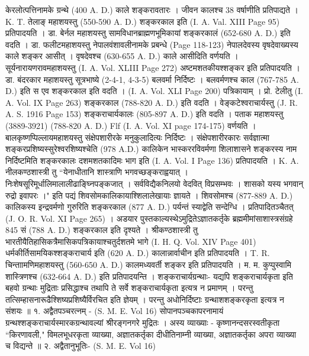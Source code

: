 केरलोत्पत्तिनामके ग्रन्थे (400 A. D.) काले शङ्करावतारः । जीवन कालश्च 38 वर्षाणीति प्रतिपाद्यते । K. T. तेलाङ् महाशयस्तु (550-590 A. D.) शङ्करकाल इति  (I. A. Val. XIII Page 95) प्रतिपादयति । डा. बेर्नल महाशयस्तु सामविधानब्राह्मणभूमिकायां शङ्करकालं (652-680 A. D.) इति वदति । डा. फलीटमहाशयस्तु नेपालवंशावलीनामके प्रबन्धे  (Page 118-123) नेपालदेवस्य वृषदेवाख्यस्य काले शङ्कर आसीत् । वृषदेवश्च (630-655 A. D.) काले आसीदिति वर्णयति । सूर्यनारायणरावमहाशयस्तु (I. A. Vol. XLIII Page 272) अष्टमशतकीयश्शङ्कर इति प्रतिपादयति । डा. बंदरकार महाशयस्तु सूत्रभाष्ये (2-4-1, 4-3-5) बलवर्मा निर्दिष्टः । बलवर्मणश्च काल (767-785 A. D.) इति स एव शङ्करकाल इति वदति । (I. A. Vol. XLI Page 200) पत्रिकायाम् । प्रो. टेलीतु (I. A. Vol. IX Page 263) शङ्करकाल (788-820 A. D.) इति वदति । वेङ्कटेश्वराचार्यस्तु (J. R. A. S. 1916 Page 153) शङ्कराचार्यकालः (805-897 A. D.) इति वदति । पताक महाशयस्तु (3889-3921) (788-820 A. D.) Flf (I. A. Vol. XI page 174-175) वर्णयति । बालकृष्णप्पिल्लायमहाशयस्तु संक्षेपशारीरके मनुकुलादित्यः निर्दिष्टः । संक्षेपशारीरकारः सर्वज्ञात्मा शङ्करप्रशिष्यस्सुरेश्वरशिष्यश्चेति (978 A.D.) कालिकेन भास्कररविवर्मणा शिलाशासने शङ्करस्य नाम निर्दिष्टमिति शङ्करकालः दशमशतकादिमः भाग इति (I. A. Vol. I Page 136) प्रतिपादयति । K. A. नीलकण्ठशास्त्री तु ``येनाधीतानि शास्त्राणि भगवच्छङ्कराह्वयात् । निःशेषसूरिमूर्धालिमालालीढाङ्घ्निपङ्कजात् । सर्वविद्यैकनिलयो वेदवित् विप्रसम्भवः । शासको यस्य भगवान् रुद्रो इवापरः ।" इति पद्यं शिवसोमकालिकायाश्शिलालेखायाः ज्ञायते । शिवसोमश्च (877-889 A. D.) कालिकस्य इन्द्रवर्मणो गुरुरिति शङ्करकाल (877 A. D.) पर्यन्तं स्याद्वेति सन्देग्धि । प्रतिपादितञ्चैतत् (J. O. R. Vol. XI Page 265) । अडयार पुस्तकाल्यस्थेऽमुद्रितेऽज्ञातकर्तृके ब्रह्ममीमांसाशास्त्रसंग्रहे 845 सं (788 A. D.) शङ्करकाल इति दृश्यते । श्रीकण्ठशास्त्री तु भारतीयैतिहासिकत्रैमासिकपत्रिकायाश्चतुर्दशतमे भागे (I. H. Q. Vol. XIV Page 401) धर्मकीर्तिसामयिकश्शङ्कराचार्य इति (620 A. D.) कालान्नार्वाचीन इति प्रतिपादयति । T. R. चिन्ताामणिमहाशयस्तु (560-650 A. D.) कालमध्यवर्ती शङ्कर इति प्रतिपादयति । म. म. कुप्पुस्वामि शास्त्रिणश्च (632-664 A. D.) इति प्रतिपादयन्ति । 
शङ्कराचार्यग्रन्थाः-
यद्यपि शङ्कराचार्यकृता इति बहवो ग्रन्थाः मुद्रिताः प्रसिद्धाश्च तथापि ते सर्वे शङ्कराचार्यकृता इत्यत्र न प्रमाणम् । परन्तु तत्सिम्हासनारूढैश्शिष्यप्रशिष्यैर्विरचित इति ज्ञेयम् । परन्तु अधोनिर्दिष्टाः ग्रन्थाशशङ्करकृता इत्यत्र न संशयः ॥
१. अद्वैतपञ्चरत्नम् - (S. M. E. Vol 16)
सोपानपञ्चकापरनामायं ग्रन्थश्शङ्कराचार्यस्मारकग्रन्थावल्यां श्रीरङ्गनगरे मुद्रितः । अस्य व्याख्याः - कृष्णानन्दसरस्वतीकृता ``किरणावली," विमलभूधरकृता व्याख्या, अज्ञातकर्तृका दीधीतिनाम्नी व्याख्या, अज्ञातकर्तृका अपरा व्याख्या च विद्यन्ते ॥
२. अद्वैतानुभूतिः- (S. M. E. Vol 16)
